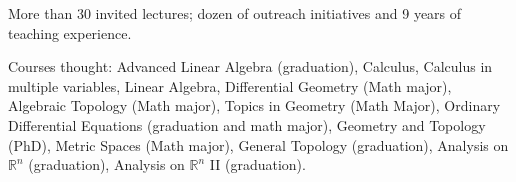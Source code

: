 \documentclass[10pt]{article}
\newenvironment{innerlist}[1][\enskip\textbullet]%
{\begin{compactitem}[#1]}{\end{compactitem}}
\newcommand{\blankline}{\quad\pagebreak[2]}
\begin{document}
	
\begin{innerlist}[-]
\item 	More than 30 invited lectures; dozen of outreach initiatives and 9 years of teaching experience.
	
	Courses thought: Advanced Linear Algebra (graduation),	Calculus, Calculus in multiple variables, Linear Algebra,  Differential Geometry (Math major), Algebraic Topology (Math major), Topics in Geometry (Math Major), Ordinary Differential Equations (graduation and math major), Geometry and Topology (PhD),	  Metric Spaces (Math major), General Topology (graduation), Analysis on $\mathbb R^n$ (graduation), Analysis on $\mathbb{R}^n$ II (graduation). 
	
	

\end{innerlist}	
%	
%	
%	
%	
%	
%	
%	
\end{document}
